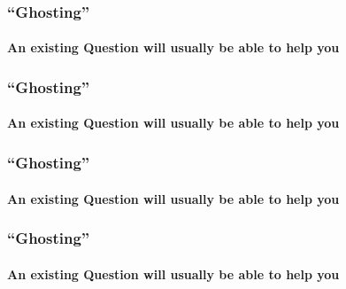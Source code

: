 \documentclass{beamer}
\begin{document}
  \begin{frame}  
    \frametitle{``Ghosting''}
    \framesubtitle{An existing Question will usually be able to help you}
    
    \begin{center}
     
      
    \end{center}  
  \end{frame}
  \begin{frame}  
    \frametitle{``Ghosting''}
    \framesubtitle{An existing Question will usually be able to help you}
    
    \begin{center}
     
      
    \end{center}  
  \end{frame}
  \begin{frame}  
    \frametitle{``Ghosting''}
    \framesubtitle{An existing Question will usually be able to help you}
    
    \begin{center}
     
      
    \end{center}  
  \end{frame}
  \begin{frame}  
    \frametitle{``Ghosting''}
    \framesubtitle{An existing Question will usually be able to help you}
    
    \begin{center}
     
      
    \end{center}  
  \end{frame}
\end{document}
